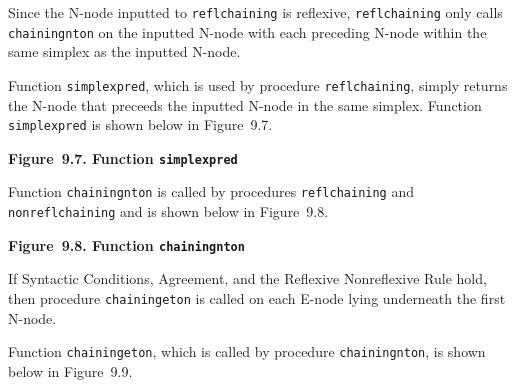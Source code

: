 \documentclass{article}
\begin{document}
Since the N-node inputted to \texttt{reflchaining} is reflexive,
\texttt{reflchaining} only calls \texttt{chainingnton} on the
inputted N-node with each preceding N-node within the same
simplex as the inputted N-node.

Function \texttt{simplexpred}, which is used by procedure
\texttt{reflchaining}, simply returns the N-node that preceeds
the inputted N-node in the same simplex. Function \texttt{simplexpred}
is shown below in Figure~9.7.

\bigbreak
\begin{minipage}{\textwidth}
\vbox{}
\bigbreak
{}
\textbf{Figure~9.7. Function \texttt{simplexpred}}
\end{minipage}
\bigbreak

Function \texttt{chainingnton} is called by procedures
\texttt{reflchaining} and \texttt{nonreflchaining} and is shown
below in Figure~9.8.

\bigbreak
\begin{minipage}{\textwidth}
\vbox{}
\bigbreak
{}
\textbf{Figure~9.8. Function \texttt{chainingnton}}
\end{minipage}
\bigbreak

If Syntactic Conditions, Agreement, and the Reflexive
Nonreflexive Rule hold, then procedure \texttt{chainingeton} is
called on each E-node lying underneath the first N-node.

Function \texttt{chainingeton}, which is called by procedure
\texttt{chainingnton}, is shown below in Figure~9.9.
\end{document}
